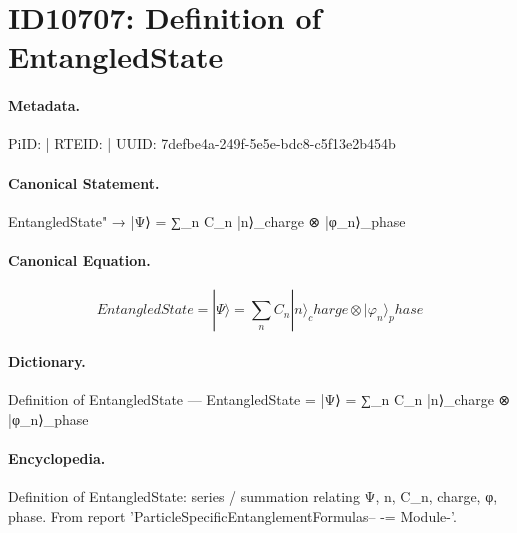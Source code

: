 \section*{ID10707: Definition of EntangledState}
\paragraph{Metadata.}
PiID:  | RTEID:  | UUID: 7defbe4a-249f-5e5e-bdc8-c5f13e2b454b

\paragraph{Canonical Statement.}
EntangledState" → |Ψ⟩ = ∑\_n C\_n |n⟩\_charge ⊗ |φ\_n⟩\_phase

\paragraph{Canonical Equation.}
\[
EntangledState = |Ψ⟩ = ∑_n C_n |n⟩_charge ⊗ |φ_n⟩_phase
\]

\paragraph{Dictionary.}
Definition of EntangledState — EntangledState = |Ψ⟩ = ∑\_n C\_n |n⟩\_charge ⊗ |φ\_n⟩\_phase

\paragraph{Encyclopedia.}
Definition of EntangledState: series / summation relating Ψ, n, C\_n, charge, φ, phase. From report 'ParticleSpecificEntanglementFormulas-- -= Module-'.
